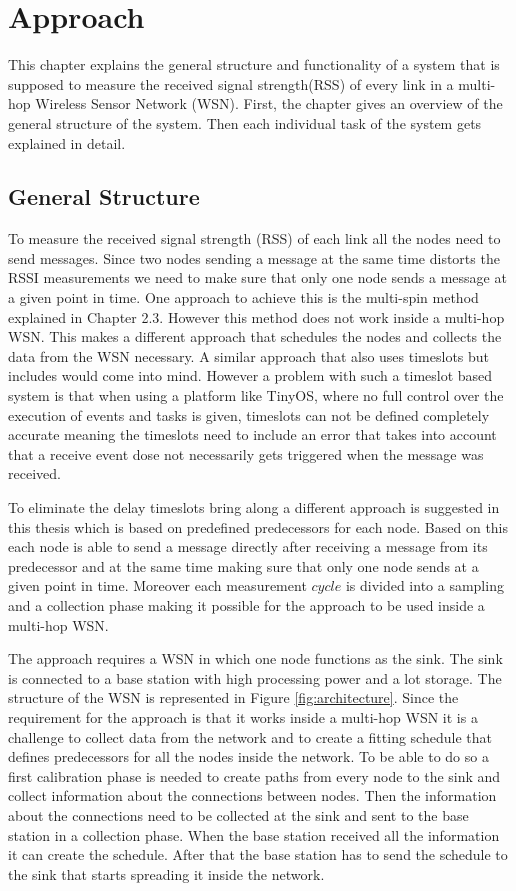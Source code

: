 \chapter{Approach}
\label{chp:apr}
This chapter explains the general structure and functionality of a system that is supposed to measure the received signal strength(RSS) of every link in a multi-hop Wireless Sensor Network (WSN). First, the chapter gives an overview of the general structure of the system. Then each individual task of the system gets explained in detail.

\section{General Structure}
\label{chp:apr_general}

To measure the received signal strength (RSS) of each link all the nodes need to send messages. Since two nodes sending a message at the same time distorts the RSSI measurements we need to make sure that only one node sends a message at a given point in time. One approach to achieve this is the multi-spin method explained in Chapter 2.3. However this method does not work inside a multi-hop WSN. This makes a different approach that schedules the nodes and collects the data from the WSN necessary. A similar approach that also uses timeslots but includes  would come into mind. However a problem with such a timeslot based system is that when using a platform like TinyOS, where no full control over the execution of events and tasks is given, timeslots can not be defined completely accurate meaning the timeslots need to include an error that takes into account that a receive event dose not necessarily gets triggered when the message was received.
 
To eliminate the delay timeslots bring along a different approach is suggested in this thesis which is based on predefined predecessors for each node. Based on this each node is able to send a message directly after receiving a message from its predecessor and at the same time making sure that only one node sends at a given point in time. Moreover each measurement $cycle$ is divided into a sampling and a collection phase making it possible for the approach to be used inside a multi-hop WSN.

The approach requires a WSN in which one node functions as the sink. The sink is connected to a base station with high processing power and a lot storage. The structure of the WSN is represented in Figure \ref{fig:architecture}. Since the requirement for the approach is that it works inside a multi-hop WSN it is a challenge to collect data from the network and to create a fitting schedule that defines predecessors for all the nodes inside the network. To be able to do so a first calibration phase is needed to create paths from every node to the sink and collect information about the connections between nodes. Then the information about the connections need to be collected at the sink and sent to the base station in a collection phase. When the base station received all the information it can create the schedule. After that the base station has to send the schedule to the sink that starts spreading it inside the network. 

